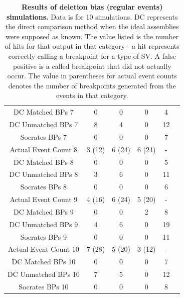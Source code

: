 \documentclass{easychithesis}
\begin{document}
\begin{table}[h]
\begin{center}
\begin{tabular}{|c|c|c|c|c|c|}
        DC Matched BPs 7 & 0 & 0 & 0 & 4\\
        DC Unmatched BPs 7 & 8 & 4 & 0 & 12\\
        Socrates BPs 7 & 0 & 0 & 0 & 7\\
         \hline 
        Actual Event Count 8 & 3 (12) & 6 (24) & 6 (24) & -\\
        DC Matched BPs 8 & 0 & 0 & 0 & 5\\
        DC Unmatched BPs 8 & 3 & 6 & 0 & 11\\
        Socrates BPs 8 & 0 & 0 & 0 & 6\\
         \hline 
        Actual Event Count 9 & 4 (16) & 6 (24) & 5 (20) & -\\
        DC Matched BPs 9 & 0 & 0 & 2 & 8\\
        DC Unmatched BPs 9 & 4 & 6 & 0 & 19\\
        Socrates BPs 9 & 0 & 0 & 0 & 11\\
         \hline 
        Actual Event Count 10 & 7 (28) & 5 (20) & 3 (12) & -\\
        DC Matched BPs 10 & 0 & 0 & 0 & 7\\
        DC Unmatched BPs 10 & 7 & 5 & 0 & 12\\
        Socrates BPs 10 & 0 & 0 & 0 & 8\\        
        \hline
\end{tabular}
\caption{{\bf Results of deletion bias (regular events) simulations.} Data is for 10 simulations. DC represents the direct comparison method when the ideal assemblies were supposed as known. The value listed is the number of hits for that output in that category - a hit represents correctly calling a breakpoint for a type of SV. A false positive is a called breakpoint that did not actually occur. The value in parentheses for actual event counts denotes the number of breakpoints generated from the events in that category.}
\end{center}
\end{table}
\end{document}
